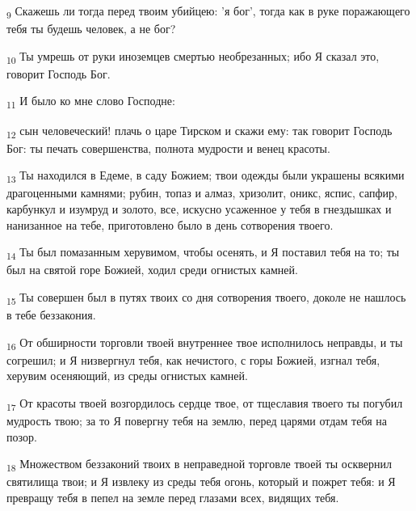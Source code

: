 \begin{tcolorbox}
\textsubscript{9} Скажешь ли тогда перед твоим убийцею: 'я бог', тогда как в руке поражающего тебя ты будешь человек, а не бог?
\end{tcolorbox}
\begin{tcolorbox}
\textsubscript{10} Ты умрешь от руки иноземцев смертью необрезанных; ибо Я сказал это, говорит Господь Бог.
\end{tcolorbox}
\begin{tcolorbox}
\textsubscript{11} И было ко мне слово Господне:
\end{tcolorbox}
\begin{tcolorbox}
\textsubscript{12} сын человеческий! плачь о царе Тирском и скажи ему: так говорит Господь Бог: ты печать совершенства, полнота мудрости и венец красоты.
\end{tcolorbox}
\begin{tcolorbox}
\textsubscript{13} Ты находился в Едеме, в саду Божием; твои одежды были украшены всякими драгоценными камнями; рубин, топаз и алмаз, хризолит, оникс, яспис, сапфир, карбункул и изумруд и золото, все, искусно усаженное у тебя в гнездышках и нанизанное на тебе, приготовлено было в день сотворения твоего.
\end{tcolorbox}
\begin{tcolorbox}
\textsubscript{14} Ты был помазанным херувимом, чтобы осенять, и Я поставил тебя на то; ты был на святой горе Божией, ходил среди огнистых камней.
\end{tcolorbox}
\begin{tcolorbox}
\textsubscript{15} Ты совершен был в путях твоих со дня сотворения твоего, доколе не нашлось в тебе беззакония.
\end{tcolorbox}
\begin{tcolorbox}
\textsubscript{16} От обширности торговли твоей внутреннее твое исполнилось неправды, и ты согрешил; и Я низвергнул тебя, как нечистого, с горы Божией, изгнал тебя, херувим осеняющий, из среды огнистых камней.
\end{tcolorbox}
\begin{tcolorbox}
\textsubscript{17} От красоты твоей возгордилось сердце твое, от тщеславия твоего ты погубил мудрость твою; за то Я повергну тебя на землю, перед царями отдам тебя на позор.
\end{tcolorbox}
\begin{tcolorbox}
\textsubscript{18} Множеством беззаконий твоих в неправедной торговле твоей ты осквернил святилища твои; и Я извлеку из среды тебя огонь, который и пожрет тебя: и Я превращу тебя в пепел на земле перед глазами всех, видящих тебя.
\end{tcolorbox}
